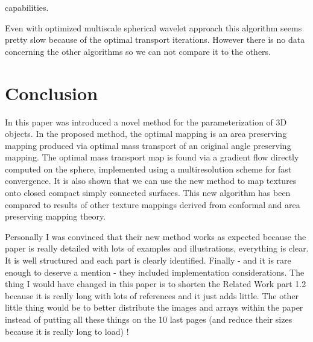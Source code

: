 capabilities.\documentclass[11pt,a4paper]{article}
\begin{document}
\vskip 0.5cm
Even with optimized multiscale spherical wavelet approach this algorithm seems pretty slow because of the optimal transport iterations. However there is no data concerning the other algorithms so we can not compare it to the others. 

\section{Conclusion}

In this paper was introduced a novel method for the parameterization of 3D objects. 
In the proposed method, the optimal mapping is an area preserving mapping produced via optimal mass transport of an original angle preserving mapping. 
The optimal mass transport map is found via a gradient flow directly computed on the sphere, implemented using a multiresolution scheme
for fast convergence. 
It is also shown that we can use the new method to map textures onto closed compact simply connected surfaces.
This new algorithm has been compared to results of other texture mappings derived from conformal and area preserving mapping theory.

\vskip 0.5cm
Personally I was convinced that their new method works as expected because the paper is really detailed with lots of examples and illustrations, everything is clear.
It is well structured and each part is clearly identified. Finally - and it is rare enough to deserve a mention - they included implementation considerations.
The thing I would have changed in this paper is to shorten the Related Work part 1.2 because it is really long with lots of references and it just adds little. The other little thing would be to better distribute the images and arrays within the paper instead of putting all these things on the 10 last pages (and reduce their sizes because it is really long to load) !



\end{document}
